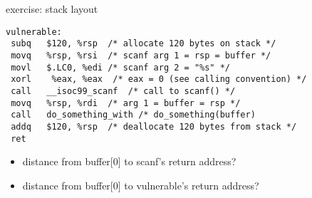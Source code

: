 \begin{frame}[fragile,label=smashExStackLayoutExer]{exercise: stack layout}
\lstset{language=myasm,style=small}
\begin{lstlisting}
vulnerable:
 subq	$120, %rsp  /* allocate 120 bytes on stack */
 movq	%rsp, %rsi  /* scanf arg 1 = rsp = buffer */
 movl	$.LC0, %edi /* scanf arg 2 = "%s" */
 xorl    %eax, %eax  /* eax = 0 (see calling convention) */
 call	__isoc99_scanf  /* call to scanf() */
 movq	%rsp, %rdi  /* arg 1 = buffer = rsp */
 call	do_something_with /* do_something(buffer)
 addq	$120, %rsp  /* deallocate 120 bytes from stack */
 ret
\end{lstlisting}
\begin{itemize}
\item distance from buffer[0] to scanf's return address?
\item distance from buffer[0] to vulnerable's return address?
\end{itemize}
\end{frame}
